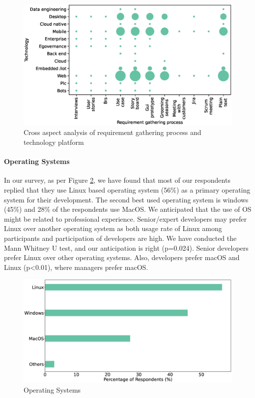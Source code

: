 \begin{figure}[h]
\centering
  \includegraphics[scale=0.47]{Figures/Requirement_Technology_Cross_Analysis.eps}
  \caption{Cross aspect analysis of requirement gathering process and technology platform}
  \label{fig:requirement technology cross analysis}
\end{figure}



\paragraph{Operating Systems}
In our survey, as per Figure \ref{fig:os}, we have found that most of our respondents replied that they use Linux based operating system (56\%) as a primary operating system for their development. The second best used operating system is windows (45\%) and 28\% of the respondents use MacOS. We anticipated that the use of OS might be related to professional experience. Senior/expert developers may prefer Linux over another operating system as both usage rate of Linux among participants and participation of developers are high. We have conducted the Mann Whitney U test, and our anticipation is right (p=0.024). Senior developers prefer Linux over other operating systems. Also, developers prefer macOS and Linux (p<0.01), where managers prefer macOS.

\begin{figure}[h]
\centering
  \includegraphics[scale=0.17]{Figures/Respondents_os}
  \caption{Operating Systems}
  \label{fig:os}
\end{figure}


